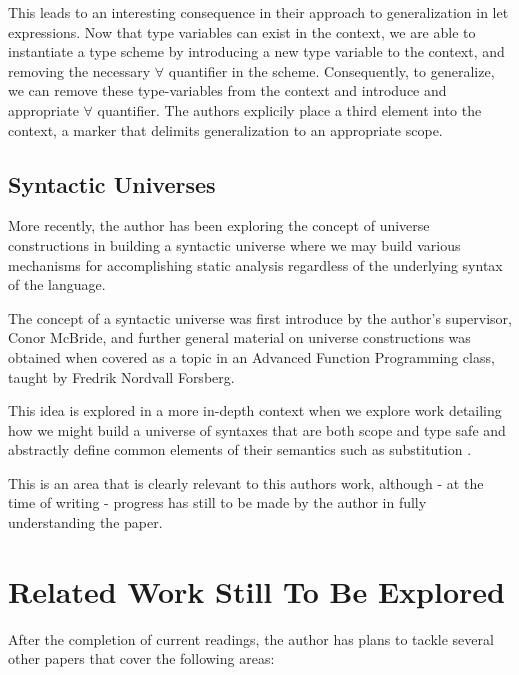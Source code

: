 \documentclass{ProgressReport}[2020/09/15]
\begin{document}
          This leads to an interesting consequence in their approach to
          generalization in let expressions. Now that type variables
          can exist in the context, we are able to instantiate a type
          scheme by introducing a new type variable to the context,
          and removing the necessary $\forall$ quantifier in the
          scheme. Consequently, to generalize, we can remove these
          type-variables from the context and introduce and
          appropriate $\forall$ quantifier. The authors explicily
          place a third element into the context, a marker that delimits
          generalization to an appropriate scope.

          \subsection{Syntactic Universes}

          More recently, the author has been exploring the concept of
          universe constructions in building a syntactic universe
          where we may build various mechanisms for accomplishing
          static analysis regardless of the underlying syntax of the
          language.

          The concept of a syntactic universe was first introduce by
          the author's supervisor, Conor McBride, and further general
          material on universe constructions was obtained when covered
          as a topic in an Advanced Function Programming class, taught
          by Fredrik Nordvall Forsberg.

          This idea is explored in a more in-depth context when we
          explore work detailing how we might build a universe of
          syntaxes that are both scope and type safe and abstractly
          define common elements of their semantics such as
          substitution \cite{DBLP:journals/corr/abs-2001-11001}.

          This is an area that is clearly relevant to this authors
          work, although - at the time of writing - progress has still
          to be made by the author in fully understanding the paper.

          \section{Related Work Still To Be Explored}

          After the completion of current readings, the author has
          plans to tackle several other papers that cover the
          following areas:
\end{document}

